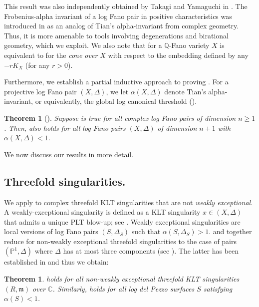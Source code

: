 \documentclass[11pt,reqno]{amsart}
\newcommand{\C}{\mathbb{C}}
\newcommand{\Q}{\mathbb{Q}}
\renewcommand{\P}{\mathbb{P}}
\newcommand{\fm}{\mathfrak{m}}
\numberwithin{equation}{section}
\newtheorem{thm}[prop] {Theorem}
\theoremstyle{definition}
\begin{document}
This result was also independently obtained by Takagi and Yamaguchi in \cite{TakagiYamaguchiUniformPositivity}. The Frobenius-alpha invariant of a log Fano pair in positive characteristics was introduced in \cite{PandeFrobeniusAlpha} as an analog of Tian's alpha-invariant from complex geometry. Thus, it is more amenable to tools involving degenerations and birational geometry, which we exploit. We also note that  for a $\Q$-Fano variety $X$ is equivalent to  for the \emph{cone over $X$} with respect to the embedding defined by any $-rK_X$ (for any $r>0$).

Furthermore, we establish a partial inductive approach to proving . For a projective log Fano pair $(X, \Delta)$, we let $\alpha(X, \Delta)$ denote Tian's alpha-invariant, or equivalently, the global log canonical threshold ().

\begin{thm}[] \label{mainthm3intro}
    Suppose  is true for all complex log Fano pairs of dimension $n \geq 1$. Then,  also holds for all log Fano pairs $(X, \Delta)$ of dimension $n+1$ with $\alpha (X, \Delta) < 1$.
\end{thm}

We now discuss our results in more detail.

\subsection{Threefold singularities.} We apply  to complex threefold KLT singularities that are not \emph{weakly exceptional}. A weakly-exceptional singularity is defined as a KLT singularity $x \in (X, \Delta)$ that admits a unique PLT blow-up; see \cite{ProkhorovBlowupsofcanonicalsingularity}. Weakly exceptional singularities are local versions of log Fano pairs $(S, \Delta_S) $ such that $\alpha (S, \Delta_S) >1$. 
 and  together reduce  for non-weakly exceptional threefold singularities to the case of pairs $(\P^1, \Delta)$ where $\Delta$ has at most three components (see ). The latter has been established in \cite{BCPTlimitFsigarxiv} and thus we obtain:
\begin{thm}
    holds for all non-weakly exceptional threefold KLT singularities $(R, \fm)$ over $\C$. Similarly,  holds for all log del Pezzo surfaces $S$ satisfying $\alpha (S) < 1$.
\end{thm}
\end{document}
